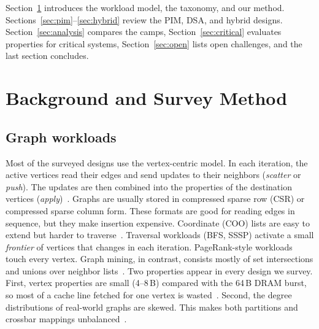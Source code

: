 \documentclass[journal,onecolumn]{IEEEtran}
\begin{document}
Section~\ref{sec:background} introduces the workload model, the taxonomy, and our method. Sections~\ref{sec:pim}--\ref{sec:hybrid} review the PIM, DSA, and hybrid designs. Section~\ref{sec:analysis} compares the camps, Section~\ref{sec:critical} evaluates properties for critical systems, Section~\ref{sec:open} lists open challenges, and the last section concludes.

\section{Background and Survey Method}\label{sec:background}
\subsection{Graph workloads}
Most of the surveyed designs use the vertex-centric model. In each iteration, the active vertices read their edges and send updates to their neighbors (\emph{scatter} or \emph{push}). The updates are then combined into the properties of the destination vertices (\emph{apply})~\cite{ham2016graphicionado,yenimol2026cograf}. Graphs are usually stored in compressed sparse row (CSR) or compressed sparse column form. These formats are good for reading edges in sequence, but they make insertion expensive. Coordinate (COO) lists are easy to extend but harder to traverse~\cite{asquini2025tc}. Traversal workloads (BFS, SSSP) activate a small \emph{frontier} of vertices that changes in each iteration. PageRank-style workloads touch every vertex. Graph mining, in contrast, consists mostly of set intersections and unions over neighbor lists~\cite{besta2021sisa}. Two properties appear in every design we survey. First, vertex properties are small (4--8\,B) compared with the 64\,B DRAM burst, so most of a cache line fetched for one vertex is wasted~\cite{shin2025piccolo}. Second, the degree distributions of real-world graphs are skewed. This makes both partitions and crossbar mappings unbalanced~\cite{zheng2020spara,cai2024pimpam}.
\end{document}
